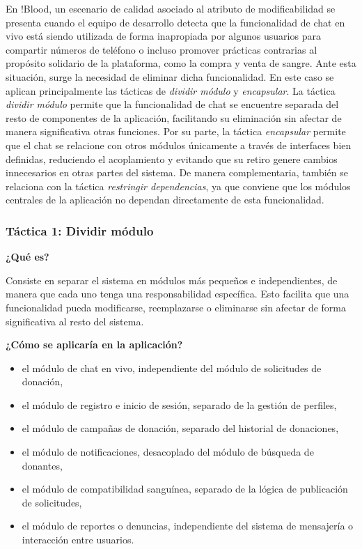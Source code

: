 En !Blood, un escenario de calidad asociado al atributo de modificabilidad se presenta cuando el equipo de desarrollo detecta que la funcionalidad de chat en vivo está siendo utilizada de forma inapropiada por algunos usuarios para compartir números de teléfono o incluso promover prácticas contrarias al propósito solidario de la plataforma, como la compra y venta de sangre. Ante esta situación, surge la necesidad de eliminar dicha funcionalidad. En este caso se aplican principalmente las tácticas de \textit{dividir módulo} y \textit{encapsular}. La táctica \textit{dividir módulo} permite que la funcionalidad de chat se encuentre separada del resto de componentes de la aplicación, facilitando su eliminación sin afectar de manera significativa otras funciones. Por su parte, la táctica \textit{encapsular} permite que el chat se relacione con otros módulos únicamente a través de interfaces bien definidas, reduciendo el acoplamiento y evitando que su retiro genere cambios innecesarios en otras partes del sistema. De manera complementaria, también se relaciona con la táctica \textit{restringir dependencias}, ya que conviene que los módulos centrales de la aplicación no dependan directamente de esta funcionalidad.

\subsubsection{Táctica 1: Dividir módulo}

\noindent\textbf{¿Qué es?}

Consiste en separar el sistema en módulos más pequeños e independientes, de manera que cada uno tenga una responsabilidad específica. Esto facilita que una funcionalidad pueda modificarse, reemplazarse o eliminarse sin afectar de forma significativa al resto del sistema.

\medskip
\noindent\textbf{¿Cómo se aplicaría en la aplicación?}

\begin{itemize}
    \item el módulo de chat en vivo, independiente del módulo de solicitudes de donación,
    \item el módulo de registro e inicio de sesión, separado de la gestión de perfiles,
    \item el módulo de campañas de donación, separado del historial de donaciones,
    \item el módulo de notificaciones, desacoplado del módulo de búsqueda de donantes,
    \item el módulo de compatibilidad sanguínea, separado de la lógica de publicación de solicitudes,
    \item el módulo de reportes o denuncias, independiente del sistema de mensajería o interacción entre usuarios.
\end{itemize}

